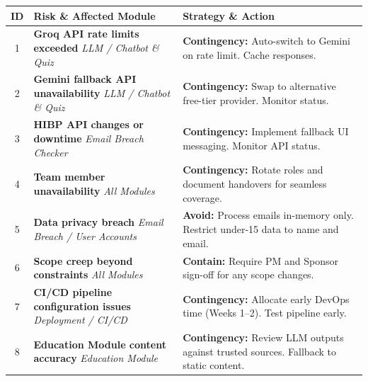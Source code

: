 \documentclass[11pt, a4paper]{report}
\begin{document}
\begin{table}[h!]
    \centering
    \small
    \renewcommand{\arraystretch}{1.2}
    \begin{tabularx}{\textwidth}{c >{\hsize=0.9\hsize\raggedright\arraybackslash}X >{\hsize=1.1\hsize\raggedright\arraybackslash}X}
        \toprule
        \textbf{ID} & \textbf{Risk \& Affected Module} & \textbf{Strategy \& Action} \\
        \midrule
        \cellcolor{riskMedium} 1 & \textbf{Groq API rate limits exceeded} \newline \textit{LLM / Chatbot \& Quiz} & \textbf{Contingency:} Auto-switch to Gemini on rate limit. Cache responses. \\
        \midrule
        \cellcolor{riskLow} 2    & \textbf{Gemini fallback API unavailability} \newline \textit{LLM / Chatbot \& Quiz} & \textbf{Contingency:} Swap to alternative free-tier provider. Monitor status. \\
        \midrule
        \cellcolor{riskMedium} 3 & \textbf{HIBP API changes or downtime} \newline \textit{Email Breach Checker} & \textbf{Contingency:} Implement fallback UI messaging. Monitor API status. \\
        \midrule
        \cellcolor{riskMedium} 4 & \textbf{Team member unavailability} \newline \textit{All Modules} & \textbf{Contingency:} Rotate roles and document handovers for seamless coverage. \\
        \midrule
        \cellcolor{riskHigh} 5   & \textbf{Data privacy breach} \newline \textit{Email Breach / User Accounts} & \textbf{Avoid:} Process emails in-memory only. Restrict under-15 data to name and email. \\
        \midrule
        \cellcolor{riskMedium} 6 & \textbf{Scope creep beyond constraints} \newline \textit{All Modules} & \textbf{Contain:} Require PM and Sponsor sign-off for any scope changes. \\
        \midrule
        \cellcolor{riskHigh} 7   & \textbf{CI/CD pipeline configuration issues} \newline \textit{Deployment / CI/CD} & \textbf{Contingency:} Allocate early DevOps time (Weeks 1--2). Test pipeline early. \\
        \midrule
        \cellcolor{riskMedium} 8 & \textbf{Education Module content accuracy} \newline \textit{Education Module} & \textbf{Contingency:} Review LLM outputs against trusted sources. Fallback to static content. \\

\end{tabularx}
\end{table}
\end{document}

